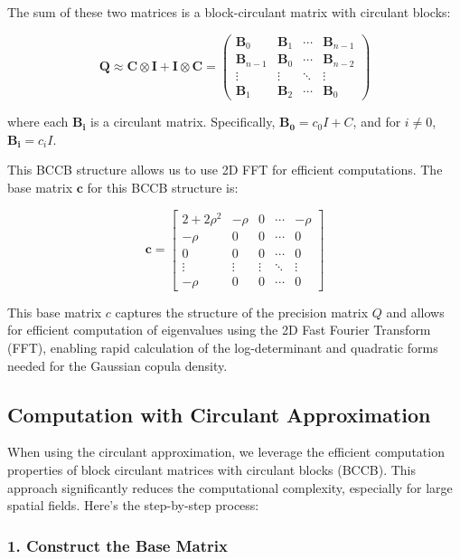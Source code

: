 \documentclass[journal=,manuscript=]{achemso}
\begin{document}
The sum of these two matrices is a block-circulant matrix with circulant
blocks:

\[
\mathbf{Q} \approx \mathbf{C} \otimes \mathbf{I} + \mathbf{I} \otimes \mathbf{C} = 
\begin{pmatrix}
\mathbf{B}_0 & \mathbf{B}_1 & \cdots & \mathbf{B}_{n-1} \\
\mathbf{B}_{n-1} & \mathbf{B}_0 & \cdots & \mathbf{B}_{n-2} \\
\vdots & \vdots & \ddots & \vdots \\
\mathbf{B}_1 & \mathbf{B}_2 & \cdots & \mathbf{B}_0
\end{pmatrix}
\]

where each \(\mathbf{B_i}\) is a circulant matrix. Specifically,
\(\mathbf{B_0} = c_0I + C\), and for \(i \neq 0\),
\(\mathbf{B_i} = c_iI\).

This BCCB structure allows us to use 2D FFT for efficient computations.
The base matrix \(\mathbf c\) for this BCCB structure is:

\[
\mathbf{c} = \begin{bmatrix}
2+2\rho^2 & -\rho & 0 & \cdots  & -\rho \\
-\rho & 0 & 0 & \cdots  & 0 \\
0 & 0 & 0 & \cdots  & 0 \\
\vdots & \vdots & \vdots & \ddots &  \vdots \\
-\rho & 0 & 0 & \cdots  & 0
\end{bmatrix}
\]

This base matrix \(c\) captures the structure of the precision matrix
\(Q\) and allows for efficient computation of eigenvalues using the 2D
Fast Fourier Transform (FFT), enabling rapid calculation of the
log-determinant and quadratic forms needed for the Gaussian copula
density.

\subsection{Computation with Circulant
Approximation}\label{computation-with-circulant-approximation}

When using the circulant approximation, we leverage the efficient
computation properties of block circulant matrices with circulant blocks
(BCCB). This approach significantly reduces the computational
complexity, especially for large spatial fields. Here's the step-by-step
process:

\subsubsection{1. Construct the Base
Matrix}\label{construct-the-base-matrix}
\end{document}
